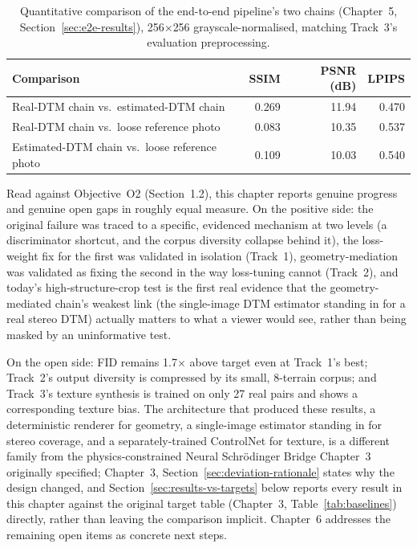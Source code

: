 \begin{table}[H]
  \caption{Quantitative comparison of the end-to-end pipeline's two chains (Chapter~5, Section~\ref{sec:e2e-results}), 256$\times$256 grayscale-normalised, matching Track~3's evaluation preprocessing.}
  \label{tab:e2e-metrics}
  \centering
  \begin{tabular}{lrrr}
    \toprule
    Comparison & SSIM & PSNR (dB) & LPIPS \\
    \midrule
    Real-DTM chain vs.\ estimated-DTM chain & 0.269 & 11.94 & 0.470 \\
    Real-DTM chain vs.\ loose reference photo & 0.083 & 10.35 & 0.537 \\
    Estimated-DTM chain vs.\ loose reference photo & 0.109 & 10.03 & 0.540 \\
    \bottomrule
  \end{tabular}
\end{table}

Read against Objective~O2 (Section~1.2), this chapter reports genuine progress and genuine open gaps in roughly equal measure. On the positive side: the original failure was traced to a specific, evidenced mechanism at two levels (a discriminator shortcut, and the corpus diversity collapse behind it), the loss-weight fix for the first was validated in isolation (Track~1), geometry-mediation was validated as fixing the second in the way loss-tuning cannot (Track~2), and today's high-structure-crop test is the first real evidence that the geometry-mediated chain's weakest link (the single-image DTM estimator standing in for a real stereo DTM) actually matters to what a viewer would see, rather than being masked by an uninformative test.

On the open side: FID remains 1.7$\times$ above target even at Track~1's best; Track~2's output diversity is compressed by its small, 8-terrain corpus; and Track~3's texture synthesis is trained on only 27 real pairs and shows a corresponding texture bias. The architecture that produced these results, a deterministic renderer for geometry, a single-image estimator standing in for stereo coverage, and a separately-trained ControlNet for texture, is a different family from the physics-constrained Neural Schr\"{o}dinger Bridge Chapter~3 originally specified; Chapter~3, Section~\ref{sec:deviation-rationale} states why the design changed, and Section~\ref{sec:results-vs-targets} below reports every result in this chapter against the original target table (Chapter~3, Table~\ref{tab:baselines}) directly, rather than leaving the comparison implicit. Chapter~6 addresses the remaining open items as concrete next steps.

